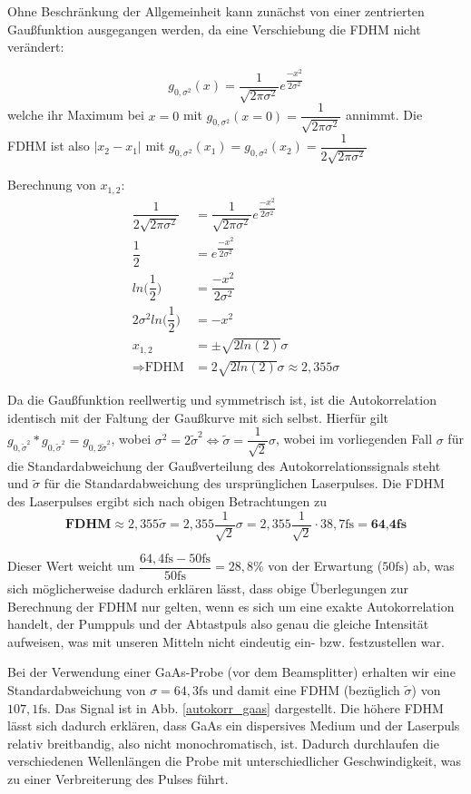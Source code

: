 \documentclass[a4paper,12pt]{scrartcl}
\begin{document}
Ohne Beschränkung der Allgemeinheit kann zunächst von einer zentrierten Gaußfunktion ausgegangen werden, da eine Verschiebung die FDHM nicht verändert:

\[g_{0,\sigma^2}(x)=\dfrac{1}{\sqrt{2\pi\sigma^2}}e^{\dfrac{-x^2}{2\sigma^2}}\]
welche ihr Maximum bei $x=0$ mit $g_{0,\sigma^2}(x=0)=\dfrac{1}{\sqrt{2\pi\sigma^2}}$ annimmt. Die FDHM ist also $|x_{2}-x_{1}|$ mit $g_{0,\sigma^2}(x_{1})=g_{0,\sigma^2}(x_{2})=\dfrac{1}{2\sqrt{2\pi\sigma^2}}$

Berechnung von $x_{1,2}$:
\begin{align*}
\dfrac{1}{2\sqrt{2\pi\sigma^2}}&=\dfrac{1}{\sqrt{2\pi\sigma^2}}e^{\dfrac{-x^2}{2\sigma^2}}\\
\dfrac{1}{2}&=e^{\dfrac{-x^2}{2\sigma^2}}\\
ln\Big(\dfrac{1}{2}\Big)&=\dfrac{-x^2}{2\sigma^2}\\
2\sigma^2ln\Big(\dfrac{1}{2}\Big)&=-x^2\\
x_{1,2}&=\pm\sqrt{2ln(2)}\sigma\\
\Rightarrow \text{FDHM}&=2\sqrt{2ln(2)}\sigma\approx2,355\sigma
\end{align*}

Da die Gaußfunktion reellwertig und symmetrisch ist, ist die Autokorrelation identisch mit der Faltung der Gaußkurve mit sich selbst. Hierfür gilt $g_{0,\tilde{\sigma}^2} \ast g_{0,\tilde{\sigma}^2} = g_{0,2\tilde{\sigma}^2}$, wobei $\sigma^2=2\tilde{\sigma}^2 \Leftrightarrow \tilde{\sigma}=\dfrac{1}{\sqrt{2}}\sigma$, wobei im vorliegenden Fall $\sigma$ für die Standardabweichung der Gaußverteilung des Autokorrelationssignals steht und $\tilde{\sigma}$ für die Standardabweichung des ursprünglichen Laserpulses. Die FDHM des Laserpulses ergibt sich nach obigen Betrachtungen zu \[\textbf{FDHM}\approx2,355\tilde{\sigma}=2,355\dfrac{1}{\sqrt{2}}\sigma=2,355\dfrac{1}{\sqrt{2}}\cdot 38,7\si{\femto\second}= \textbf{64,4fs}\]

Dieser Wert weicht um $\dfrac{64,4\si{\femto\second}-50\si{\femto\second}}{50\si{\femto\second}}=28,8\%$ von der Erwartung ($50\si{\femto\second}$) ab, was sich möglicherweise dadurch erklären lässt, dass obige Überlegungen zur Berechnung der FDHM nur gelten, wenn es sich um eine exakte Autokorrelation handelt, der Pumppuls und der Abtastpuls also genau die gleiche Intensität aufweisen, was mit unseren Mitteln nicht eindeutig ein- bzw. festzustellen war.

Bei der Verwendung einer GaAs-Probe (vor dem Beamsplitter) erhalten wir eine Standardabweichung von $\sigma=64,3\si{\femto\second}$ und damit eine FDHM (bezüglich $\tilde{\sigma}$) von $107,1\si{\femto\second}$. Das Signal ist in Abb. \ref{autokorr_gaas} dargestellt. Die höhere FDHM lässt sich dadurch erklären, dass GaAs ein dispersives Medium und der Laserpuls relativ breitbandig, also nicht monochromatisch, ist. Dadurch durchlaufen die verschiedenen Wellenlängen die Probe mit unterschiedlicher Geschwindigkeit, was zu einer Verbreiterung des Pulses führt.
\end{document}

